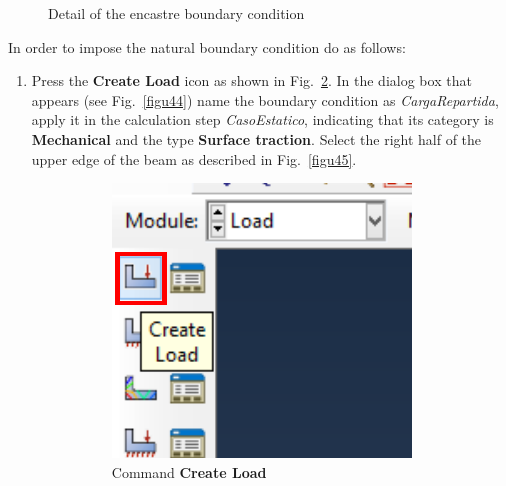 \begin{enumerate}
\begin{figure}
    \caption{Detail of the encastre boundary condition}
    \label{figu40}
  \end{figure}
\end{enumerate}


In order to impose the natural boundary condition do as follows:
\begin{enumerate}
\item Press the \textbf{Create Load} icon as shown in
  Fig.~\ref{figu43}. In the dialog box that appears (see
  Fig.~\ref{figu44}) name the boundary condition as
  \textit{CargaRepartida}, apply it in the calculation step
  \textit{CasoEstatico}, indicating that its category is
  \textbf{Mechanical} and the type \textbf{Surface traction}. Select
  the right half of the upper edge of the beam as described in
  Fig.~\ref{figu45}.
  \begin{figure}[H]
    \centering
    \begin{subfigure}{0.23\textwidth}
      \includegraphics[width=\textwidth]{./body/images/imagen43.pdf}
      \caption{Command \textbf{Create Load}}
      \label{figu43}
    \end{subfigure}%
    ~ %
    \begin{subfigure}{0.30\textwidth}

\end{subfigure}
\end{figure}
\end{enumerate}
